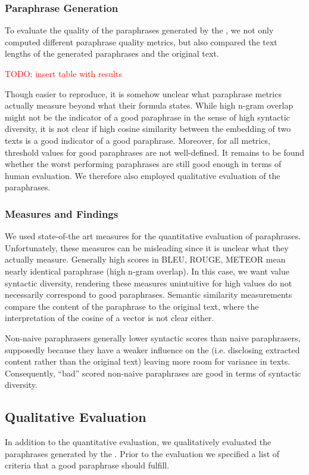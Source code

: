 \subsubsection{Paraphrase Generation}
\label{subsec:paraphrase_generation}
To evaluate the quality of the paraphrases generated by the \pgenerator{}, 
we not only computed different paraphrase quality metrics, 
but also compared the text lengths of the generated paraphrases and the original text.

\textcolor{red}{TODO: insert table with results}

Though easier to reproduce, it is somehow unclear what paraphrase metrics actually measure beyond what their formula states.
While high n-gram overlap might not be the indicator of a good paraphrase in the sense of high syntactic diversity, 
it is not clear if high cosine similarity between the embedding of two texts is a good indicator of a good paraphrase.
Moreover, for all metrics, threshold values for good paraphrases are not well-defined.
It remains to be found whether the worst performing paraphrases are still good enough in terms of human evaluation.
We therefore also employed qualitative evaluation of the paraphrases.

\subsubsection{Measures and Findings}
\label{subsec:measures_and_findings}

We used state-of-the art measures for the quantitative evaluation of paraphrases. 
Unfortunately, these measures can be misleading since it is unclear what they actually measure.
Generally high scores in BLEU, ROUGE, METEOR mean nearly identical paraphrase (high n-gram overlap).
In this case, we want value syntactic diversity, rendering these measures unintuitive 
for high values do not necessarily correspond to good paraphrases.
Semantic similarity measurements compare the content of the paraphrase to the original text, 
where the interpretation of the cosine of a vector is not clear either.

Non-naive paraphrasers generally lower syntactic scores than naive paraphrasers,
supposedly because they have a weaker influence on the \pgenerator{} 
(i.e. disclosing extracted content rather than the original text)
leaving more room for variance in texts.
Consequently, \enquote{bad} scored non-naive paraphrases are good in terms of syntactic diversity.

\subsection{Qualitative Evaluation}
\label{sec:qualitative_evaluation}

In addition to the quantitative evaluation, we qualitatively evaluated the paraphrases generated by the \pgenerator{}.
Prior to the evaluation we specified a list of criteria that a good paraphrase should fulfill.

